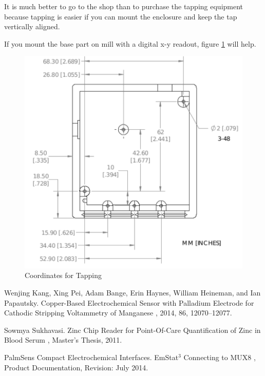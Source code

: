 \documentclass[DIV=calc, paper=letterpaper, fontsize=11pt, twocolumn]{scrartcl}	 %
\begin{document}
It is much better to go to the shop than to purchase the tapping equipment because tapping
is easier if you can mount the enclosure and keep the tap vertically aligned.

If you mount the base part on mill with a digital x-y readout, figure \ref{tap-locations} will help.

\begin{figure}[ht]
\centering
\includegraphics[width=0.9\columnwidth]{tap-location-drawing}
\caption{Coordinates for Tapping}
\label{tap-locations}
\end{figure}


\begin{thebibliography}{99} %

Wenjing Kang, Xing Pei, Adam Bange, Erin Haynes, William Heineman, and Ian Papautsky.
\newblock Copper-Based Electrochemical Sensor with Palladium Electrode for Cathodic Stripping Voltammetry of Manganese
, 2014, 86, 12070--12077.

Sowmya Sukhavasi.
\newblock Zinc Chip Reader for Point-Of-Care Quantification of Zinc in Blood Serum
, Master's Thesis, 2011.

PalmSens Compact Electrochemical Interfaces.
\newblock EmStat$^{3}$ Connecting to MUX8
, Product Documentation, Revision: July 2014.

\end{thebibliography}

\end{document}
